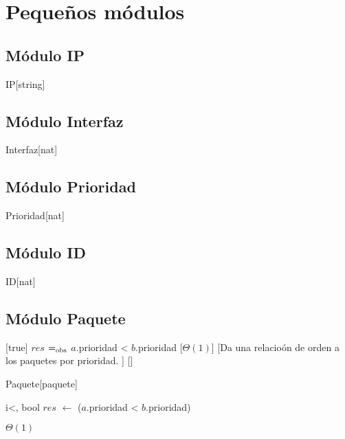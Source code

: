 \section{Peque\~nos m\'odulos}

\subsection{M\'{o}dulo IP}
    \begin{Estructura}{IP}[string]
    \end{Estructura} 

\subsection{M\'{o}dulo Interfaz}
    \begin{Estructura}{Interfaz}[nat]
    \end{Estructura} 

\subsection{M\'{o}dulo Prioridad}
    \begin{Estructura}{Prioridad}[nat]
    \end{Estructura} 

\subsection{M\'{o}dulo ID}
    \begin{Estructura}{ID}[nat]
    \end{Estructura} 

\subsection{M\'{o}dulo Paquete}
    [true]%
    {$res$ $=_{\mathrm{obs}}$ $a$.prioridad < $b$.prioridad}%
    [$\Theta(1)$]%
    [Da una relacio\'on de orden a los paquetes por prioridad. ]%
    []%
    \begin{Estructura}{Paquete}[paquete]
      \begin{Tupla}[paquete]
      \end{Tupla}
    \end{Estructura}
  \begin{algoritmo}{i<}{, }{bool}
    $res$ $\gets$ ($a$.prioridad < $b$.prioridad)
  \end{algoritmo}
  \datosAlgoritmo{} %
  {} %
  {} %
  {$\Theta(1)$} %
  {} %

